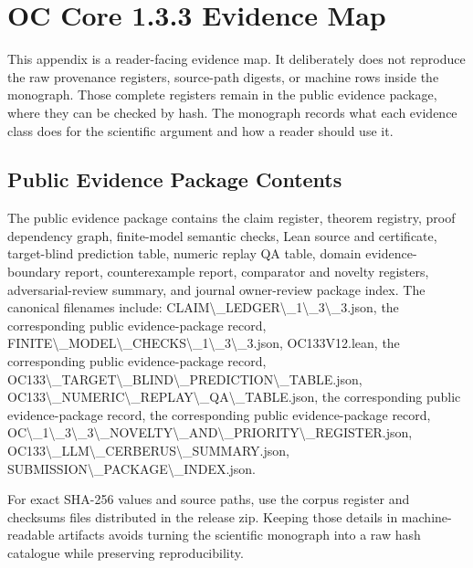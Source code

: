 \section{OC Core 1.3.3 Evidence Map}

\label{app:oc133-source-to-pdf-trace}

This appendix is a reader-facing evidence map. It deliberately does not reproduce the raw provenance registers, source-path digests, or machine rows inside the monograph. Those complete registers remain in the public evidence package, where they can be checked by hash. The monograph records what each evidence class does for the scientific argument and how a reader should use it.


\subsection{Public Evidence Package Contents}

The public evidence package contains the claim register, theorem registry, proof dependency graph, finite-model semantic checks, Lean source and certificate, target-blind prediction table, numeric replay QA table, domain evidence-boundary report, counterexample report, comparator and novelty registers, adversarial-review summary, and journal owner-review package index. The canonical filenames include: CLAIM\textbackslash{}\_LEDGER\textbackslash{}\_1\textbackslash{}\_3\textbackslash{}\_3.json, the corresponding public evidence-package record, FINITE\textbackslash{}\_MODEL\textbackslash{}\_CHECKS\textbackslash{}\_1\textbackslash{}\_3\textbackslash{}\_3.json, OC133V12.lean, the corresponding public evidence-package record, OC133\textbackslash{}\_TARGET\textbackslash{}\_BLIND\textbackslash{}\_PREDICTION\textbackslash{}\_TABLE.json, OC133\textbackslash{}\_NUMERIC\textbackslash{}\_REPLAY\textbackslash{}\_QA\textbackslash{}\_TABLE.json, the corresponding public evidence-package record, the corresponding public evidence-package record, OC\textbackslash{}\_1\textbackslash{}\_3\textbackslash{}\_3\textbackslash{}\_NOVELTY\textbackslash{}\_AND\textbackslash{}\_PRIORITY\textbackslash{}\_REGISTER.json, OC133\textbackslash{}\_LLM\textbackslash{}\_CERBERUS\textbackslash{}\_SUMMARY.json, SUBMISSION\textbackslash{}\_PACKAGE\textbackslash{}\_INDEX.json.


For exact SHA-256 values and source paths, use the corpus register and checksums files distributed in the release zip. Keeping those details in machine-readable artifacts avoids turning the scientific monograph into a raw hash catalogue while preserving reproducibility.


